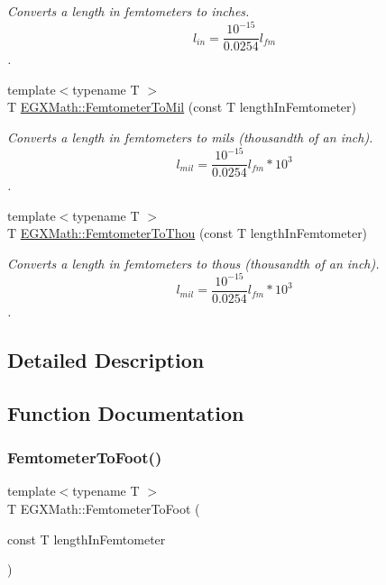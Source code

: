 \begin{DoxyCompactItemize}
\begin{DoxyCompactList}\small\item\em Converts a length in femtometers to inches. \[ l_{in}= \frac{10^{-15}}{0.0254} l_{fm} \]. \end{DoxyCompactList}\item 
{\footnotesize template$<$typename T $>$ }\\T \mbox{\hyperlink{group___e_g_x_math-_conversions-_length_conversions-_femtometer-_imperial_gacfcd599a1c2c834f3bbb5f3f991d55df}{E\+G\+X\+Math\+::\+Femtometer\+To\+Mil}} (const T length\+In\+Femtometer)
\begin{DoxyCompactList}\small\item\em Converts a length in femtometers to mils (thousandth of an inch). \[ l_{mil}= \frac{10^{-15}}{0.0254} l_{fm} * 10^{3} \]. \end{DoxyCompactList}\item 
{\footnotesize template$<$typename T $>$ }\\T \mbox{\hyperlink{group___e_g_x_math-_conversions-_length_conversions-_femtometer-_imperial_ga5c277d07215ad164ba2ad94e25b02ff1}{E\+G\+X\+Math\+::\+Femtometer\+To\+Thou}} (const T length\+In\+Femtometer)
\begin{DoxyCompactList}\small\item\em Converts a length in femtometers to thous (thousandth of an inch). \[ l_{mil}= \frac{10^{-15}}{0.0254} l_{fm} * 10^{3} \]. \end{DoxyCompactList}\end{DoxyCompactItemize}


\subsection{Detailed Description}


\subsection{Function Documentation}
\mbox{\label{group___e_g_x_math-_conversions-_length_conversions-_femtometer-_imperial_gaa33efbf3b5cee0874ad44736c0ac6fd2}} 
\subsubsection{\texorpdfstring{Femtometer\+To\+Foot()}{FemtometerToFoot()}}
{\footnotesize\ttfamily template$<$typename T $>$ \\
T E\+G\+X\+Math\+::\+Femtometer\+To\+Foot (\begin{DoxyParamCaption}\item[{const T}]{length\+In\+Femtometer }\end{DoxyParamCaption})}



